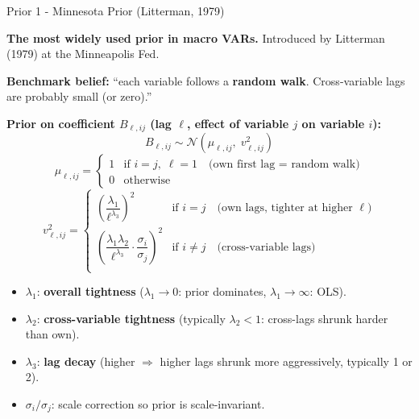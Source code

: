 \documentclass{beamer}
\begin{document}
\begin{frame}{Prior 1 - Minnesota Prior (Litterman, 1979)}
\scriptsize

\textbf{The most widely used prior in macro VARs.} Introduced by Litterman (1979) at the Minneapolis Fed.

\medskip
\textbf{Benchmark belief:} ``each variable follows a \textbf{random walk}.
Cross-variable lags are probably small (or zero).''

\medskip
\textbf{Prior on coefficient $B_{\ell,ij}$ (lag $\ell$, effect of variable $j$ on variable $i$):}
\[
B_{\ell,ij} \sim \mathcal{N}\!\left(\mu_{\ell,ij},\; v_{\ell,ij}^2\right)
\]
\[
\mu_{\ell,ij} = \begin{cases} 1 & \text{if } i=j,\; \ell=1 \quad\text{(own first lag = random walk)} \\ 0 & \text{otherwise} \end{cases}
\]
\[
v_{\ell,ij}^2 = \begin{cases}
\left(\dfrac{\lambda_1}{\ell^{\lambda_3}}\right)^2 & \text{if } i=j \quad\text{(own lags, tighter at higher } \ell) \\[8pt]
\left(\dfrac{\lambda_1 \lambda_2}{\ell^{\lambda_3}} \cdot \dfrac{\sigma_i}{\sigma_j}\right)^2 & \text{if } i\neq j \quad\text{(cross-variable lags)} \\
\end{cases}
\]

\begin{itemize}
  \item $\lambda_1$: \textbf{overall tightness} ($\lambda_1 \to 0$: prior dominates, $\lambda_1 \to \infty$: OLS).
  \item $\lambda_2$: \textbf{cross-variable tightness} (typically $\lambda_2 < 1$: cross-lags shrunk harder than own).
  \item $\lambda_3$: \textbf{lag decay} (higher $\Rightarrow$ higher lags shrunk more aggressively, typically 1 or 2).
  \item $\sigma_i/\sigma_j$: scale correction so prior is scale-invariant.
\end{itemize}

\end{frame}
\end{document}
